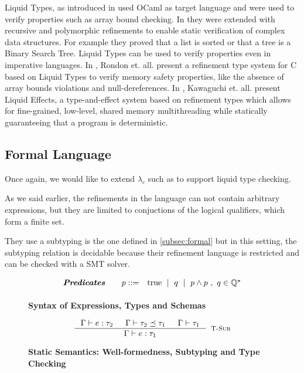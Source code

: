 Liquid Types, as introduced in \cite{LiquidPLDI08} used OCaml as target language
and were used to verify properties such as array bound checking.
In \cite{LiquidPLDI09} they were extended with recursive and polymorphic refinements
to enable static verification of complex data structures. For example they proved
that a list is sorted or that a tree is a Binary Search Tree.
%
Liquid Types can be used to verify properties even in imperative languages.
In \cite{Rondon10}, Rondon et. all. present a refinement type system for
C based on Liquid Types to verify memory safety properties, 
like the absence of array bounds violations
and null-dereferences.
In \cite{Kawaguchi12},
Kawaguchi et. all. present Liquid Effects, a type-and-effect system based on refinement types
which allows for fine-grained, low-level, shared memory multithreading while statically guaranteeing that a program is deterministic. 

\subsection{Formal Language}
Once again, we would like to extend $\lambda_c$ such as to support liquid type checking.

As we said earlier, the refinements in the language 
can not contain arbitrary expressions, but they are limited
to conjuctions of the logical qualifiers, which form a finite set.

They use a subtyping is the one defined in \ref{subsec:formal} 
but in this setting,  
the subtyping relation is decidable
because their refinement language is restricted
and can be checked with a SMT solver.

\begin{figure}[t!]
\centering
$$
\begin{array}{rrcl}
\textbf{\emph{Predicates}} \quad
  & p ::=
  & 	\text{true}
  \ \mid \  q
  \ \mid \  p \land p \ , \ q \in \mathbb{Q^\star}
  \\[0.05in] 
\end{array}
$$
\caption{\textbf{Syntax of Expressions, Types and Schemas}}
\label{fig:syntax}
\end{figure}


\begin{figure}[ht!]
\medskip {}

$$\begin{array}{cc}

\inference
  {  \hastype{\Gamma}{e}{\tau_2} && \isSubType{\Gamma}{\tau_2}{\tau_1} 
  && \isWellFormed{\Gamma}{\tau_1}
  }
  {\hastype{\Gamma}{e}{\tau_1}}
  [\tsub]
\end{array}$$

\caption{\textbf{Static Semantics: Well-formedness, Subtyping and Type Checking}}
\label{fig:rules}
\end{figure}